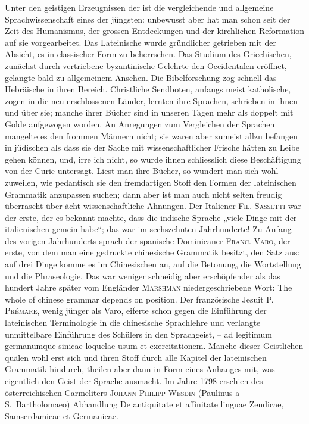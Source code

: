 \label{I.IV.neuerezeit}
\begin{sloppypar}Unter den geistigen Erzeugnissen der  ist die vergleichende und allgemeine Sprachwissenschaft eines der jüngsten: unbewusst aber hat man schon seit der Zeit des Humanismus, der grossen Entdeckungen und der kirchlichen Reformation auf sie vorgearbeitet. \label{fp.25} Das Lateinische wurde gründlicher getrieben mit der Absicht, es in classischer Form zu beherrschen. Das Studium des Griechischen, zunächst durch vertriebene byzantinische Gelehrte den Occidentalen eröffnet, gelangte bald zu allgemeinem Ansehen. Die Bibelforschung zog schnell das Hebräische in ihren Bereich. Christliche Sendboten, anfangs meist katholische, zogen in die neu erschlossenen Länder, lernten ihre Sprachen, schrieben in ihnen und über sie; manche ihrer Bücher sind in unseren Tagen mehr als doppelt mit Golde aufgewogen worden. An Anregungen zum Vergleichen der Sprachen mangelte es den frommen Männern nicht; sie waren aber zumeist allzu befangen in jüdischen  als dass sie der Sache mit wissenschaftlicher Frische hätten zu Leibe gehen können, und, irre ich nicht, so wurde ihnen schliesslich diese Beschäftigung von der Curie untersagt. Liest man ihre Bücher, so wundert man sich wohl zuweilen, wie pedantisch sie den fremdartigen Stoff den Formen der lateinischen Grammatik anzupassen suchen; dann aber ist man auch nicht selten freudig überrascht über ächt wissenschaftliche Ahnungen. Der Italiener \textsc{Fil. Sassetti} war der erste, der es bekannt machte, dass die indische Sprache „viele Dinge mit der italienischen gemein habe“; das war im sechszehnten Jahrhunderte! Zu Anfang des vorigen Jahrhunderts sprach der spanische Dominicaner \textsc{Franc. Varo}, der erste, von dem man eine gedruckte chinesische Grammatik besitzt, den Satz aus: auf drei Dinge komme es im Chinesischen an, auf die Betonung, die Wortstellung und die Phraseologie. Das war weniger schneidig aber erschöpfender als das hundert Jahre später vom Engländer \textsc{Marshman} niedergeschriebene Wort: The whole of chinese grammar depends on position. Der französische Jesuit \textsc{P. Prémare}, wenig jünger als Varo, eiferte schon gegen die Einführung der lateinischen Terminologie in die chinesische Sprachlehre und verlangte unmittelbare Ein\-\label{sp.26}führung des Schülers in den Sprachgeist, – ad legitimum germanumque sinicae loquelae usum et exercitationem. Manche dieser Geistlichen quälen wohl erst sich und ihren Stoff durch alle Kapitel der lateinischen Grammatik hindurch, theilen aber dann in Form eines Anhanges mit, was eigentlich den Geist der Sprache ausmacht. Im Jahre 1798 erschien des österreichischen Carmeliters \textsc{Johann Philipp Wesdin} (Paulinus a S.~Bartholomaeo) Abhandlung De antiquitate et affinitate linguae Zendicae, Samscrdamicae et Germanicae.\end{sloppypar}

